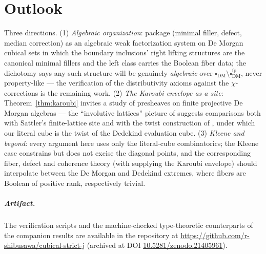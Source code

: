 \documentclass[11pt]{amsart}
\theoremstyle{definition}
\newcommand{\cube}{\square_{\mathrm{DM}}}
\newcommand{\cubefp}{\square_{\mathrm{DM}}^{\mathrm{fp}}}
\begin{document}
\section{Outlook}
\label{sec:outlook}

Three directions.  (1) \emph{Algebraic organization}: package
(minimal filler, defect, median correction) as an algebraic weak
factorization system on De Morgan cubical sets in which the
boundary inclusions' right lifting structures are the canonical
minimal fillers and the left class carries the Boolean fiber data;
the dichotomy says any such structure will be genuinely
\emph{algebraic} over $\cube \setminus \cubefp$, never property-like
--- the verification of the distributivity axioms against the
$\chi$-corrections is the remaining work.  (2) \emph{The Karoubi
envelope as a site}: Theorem~\ref{thm:karoubi} invites a study of
presheaves on finite projective De Morgan algebras --- the
``involutive lattices'' picture of \cite{BovaCabrer} suggests
comparisons both with Sattler's finite-lattice site and with the
twist construction of \cite{CavalloSattler}, under which our
literal cube is the twist of the Dedekind evaluation cube.
(3) \emph{Kleene and beyond}: every argument here uses only the
literal-cube combinatorics; the Kleene case constrains but does not
excise the diagonal points, and the corresponding fiber, defect and
coherence theory (with \cite[Thm.~12]{BovaCabrer} supplying the
Karoubi envelope) should interpolate between the De Morgan and
Dedekind extremes, where fibers are Boolean of positive rank,
respectively trivial.

\subparagraph*{Artifact.}  The verification scripts and the
machine-checked type-theoretic counterparts of the companion
results are available in the repository at
\url{https://github.com/r-shibusawa/cubical-strict-j}
(archived at DOI \href{https://doi.org/10.5281/zenodo.21405961}%
{10.5281/zenodo.21405961}).
\end{document}
